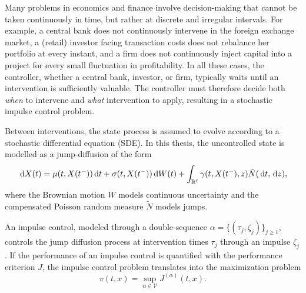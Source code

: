 Many problems in economics and finance involve decision-making that cannot be taken continuously in time, but rather at discrete and irregular intervals. For example, a central bank does not continuously intervene in the foreign exchange market, a (retail) investor facing transaction costs does not rebalance her portfolio at every instant, and a firm does not continuously inject capital into a project for every small fluctuation in profitability. In all these cases, the controller, whether a central bank, investor, or firm, typically waits until an intervention is sufficiently valuable. The controller must therefore decide both \textit{when} to intervene and \textit{what} intervention to apply, resulting in a stochastic impulse control problem.

Between interventions, the state process is assumed to evolve according to a stochastic differential equation (SDE). In this thesis, the uncontrolled state is modelled as a jump-diffusion of the form
\begin{equation*}
    \,\mathrm{d} X(t) = \mu(t,X(t^-)) \,\mathrm{d} t + \sigma(t,X(t^-)) \,\mathrm{d} W(t) + \int_{\mathbb{R}^\ell} \gamma(t,X(t^-),z) \tilde N(\,\mathrm{d} t, \,\mathrm{d} z),
\end{equation*}
where the Brownian motion $W$ models continuous uncertainty and the compensated Poisson random measure $\tilde N$ models jumps. 

An impulse control, modeled through a double-sequence $\alpha=\{(\tau_j,\zeta_j)\}_{j \geq 1}$, controls the jump diffusion process at intervention times $\tau_j$ through an impulse $\zeta_j$. If the performance of an impulse control is quantified with the performance criterion $J$, the impulse control problem translates into the maximization problem
\begin{equation*}
    v(t,x) = \sup_{\alpha \in \mathcal{V}}J^{(\alpha)}(t,x).
\end{equation*} 

